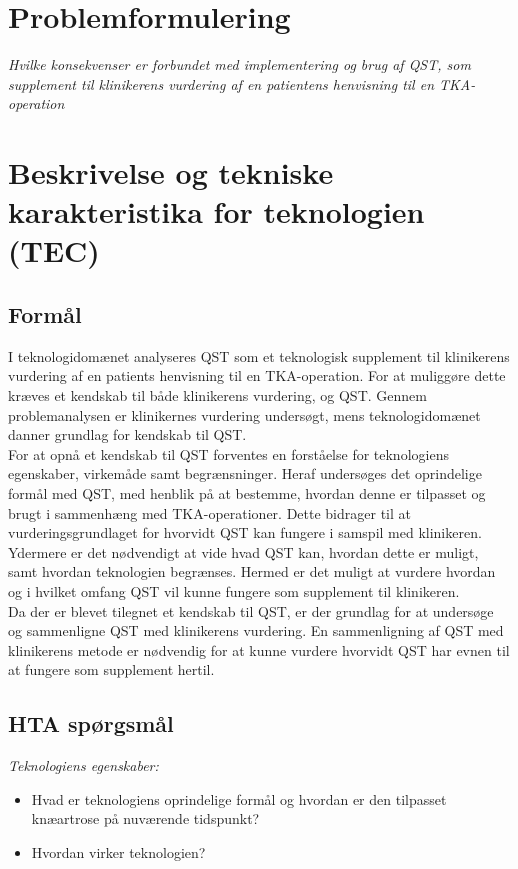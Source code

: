 \section{Problemformulering}
\begin{center}
	\textit{Hvilke konsekvenser er forbundet med implementering og brug af QST, som supplement til klinikerens vurdering af en patientens henvisning til en TKA-operation}
\end{center}

\section{Beskrivelse og tekniske karakteristika for teknologien (TEC)}
\subsection{Formål}
I teknologidomænet analyseres QST som et teknologisk supplement til klinikerens vurdering af en patients henvisning til en TKA-operation.  For at muliggøre dette kræves et kendskab til både klinikerens vurdering, og QST. Gennem problemanalysen er klinikernes vurdering undersøgt, mens teknologidomænet danner grundlag for kendskab til QST.\\
For at opnå et kendskab til QST forventes en forståelse for teknologiens egenskaber, virkemåde samt begrænsninger. Heraf undersøges det oprindelige formål med QST, med henblik på at bestemme, hvordan denne er tilpasset og brugt i sammenhæng med TKA-operationer. Dette bidrager til at vurderingsgrundlaget for hvorvidt QST kan fungere i samspil med klinikeren. Ydermere er det nødvendigt at vide hvad QST kan, hvordan dette er muligt, samt hvordan teknologien begrænses. Hermed er det muligt at vurdere hvordan og i hvilket omfang QST vil kunne fungere som supplement til klinikeren.\\
Da der er blevet tilegnet et kendskab til QST, er der grundlag for at undersøge og sammenligne QST med klinikerens vurdering. En sammenligning af QST med klinikerens metode er nødvendig for at kunne vurdere hvorvidt QST har evnen til at fungere som supplement hertil. 
\subsection{HTA spørgsmål}
\textit{Teknologiens egenskaber:}
\begin{itemize}
	\item Hvad er teknologiens oprindelige formål og hvordan er den tilpasset knæartrose på nuværende tidspunkt? %
	\item Hvordan virker teknologien?  %
\end{itemize}

